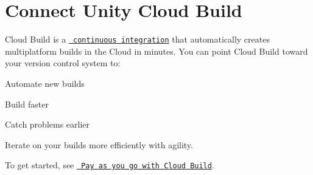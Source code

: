 \chapter{Connect Unity Cloud Build}
\hypertarget{md__library_2_package_cache_2com_8unity_8collab-proxy_0d2_83_81_2_documentation_0i_2_reconnect_c_b}{}\label{md__library_2_package_cache_2com_8unity_8collab-proxy_0d2_83_81_2_documentation_0i_2_reconnect_c_b}
\label{md__library_2_package_cache_2com_8unity_8collab-proxy_0d2_83_81_2_documentation_0i_2_reconnect_c_b_autotoc_md156}%
%
  Cloud Build is a \href{https://docs.unity3d.com/2022.2/Documentation/Manual/UnityCloudBuild.html\#automated-build-generation}{\texttt{ continuous integration}} that automatically creates multiplatform builds in the Cloud in minutes. You can point Cloud Build toward your version control system to\+:


\begin{DoxyItemize}
\item Automate new builds
\item Build faster
\item Catch problems earlier
\item Iterate on your builds more efficiently with agility.
\end{DoxyItemize}

To get started, see \href{https://docs.unity3d.com/2022.2/Documentation/Manual/UnityCloudBuildMeteredBilling.html}{\texttt{ Pay as you go with Cloud Build}}. 